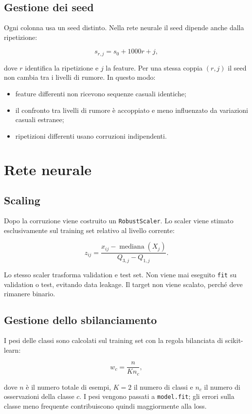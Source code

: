 \documentclass[11pt,a4paper]{article}
\begin{document}
\subsection{Gestione dei seed}

Ogni colonna usa un seed distinto. Nella rete neurale il seed dipende anche dalla ripetizione:

\[
s_{r,j}=s_0+1000r+j,
\]

dove $r$ identifica la ripetizione e $j$ la feature. Per una stessa coppia $(r,j)$ il seed non cambia tra i livelli di rumore. In questo modo:

\begin{itemize}[noitemsep]
    \item feature differenti non ricevono sequenze casuali identiche;
    \item il confronto tra livelli di rumore è accoppiato e meno influenzato da variazioni casuali estranee;
    \item ripetizioni differenti usano corruzioni indipendenti.
\end{itemize}

\section{Rete neurale}

\subsection{Scaling}

Dopo la corruzione viene costruito un \texttt{RobustScaler}. Lo scaler viene stimato esclusivamente sul training set relativo al livello corrente:

\[
z_{ij}=\frac{x_{ij}-\operatorname{mediana}(X_j)}{Q_{3,j}-Q_{1,j}}.
\]

Lo stesso scaler trasforma validation e test set. Non viene mai eseguito \texttt{fit} su validation o test, evitando data leakage. Il target non viene scalato, perché deve rimanere binario.

\subsection{Gestione dello sbilanciamento}

I pesi delle classi sono calcolati sul training set con la regola bilanciata di scikit-learn:

\[
w_c=\frac{n}{K n_c},
\]

dove $n$ è il numero totale di esempi, $K=2$ il numero di classi e $n_c$ il numero di osservazioni della classe $c$. I pesi vengono passati a \texttt{model.fit}; gli errori sulla classe meno frequente contribuiscono quindi maggiormente alla loss.
\end{document}
